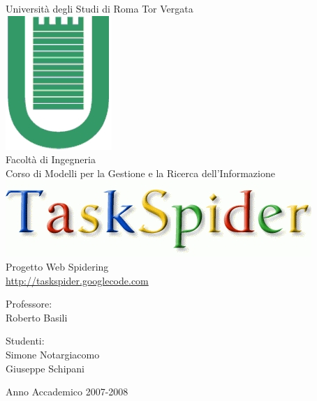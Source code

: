 \begin{titlepage}
\begin{center}
\LARGE{Università degli Studi di Roma Tor Vergata}\\
\vspace{10mm}
\includegraphics[scale=0.50]{etc/logo1.jpg}\\
Facoltà di Ingegneria\\
\vspace{5mm}
\normalsize{Corso di Modelli per la Gestione e la Ricerca dell'Informazione}\\
\vspace{20mm}
\includegraphics[scale=0.40]{etc/taskspiderlogo.jpg}\\
\large{Progetto Web Spidering}\\
\url{http://taskspider.googlecode.com}\\
\end{center}
\vspace{40mm}
\begin{minipage}[t]{0.30\textwidth}
\begin{center}
{\normalsize{Professore:\\
Roberto Basili}}
\end{center}
\end{minipage}
\hfill
\begin{minipage}[t]{0.30\textwidth}
\begin{center}
{\normalsize{Studenti:\\
Simone Notargiacomo\\
Giuseppe Schipani}}
\end{center}
\end{minipage}
\vspace{10mm}
\begin{center}
Anno Accademico 2007-2008
\end{center}

\end{titlepage}